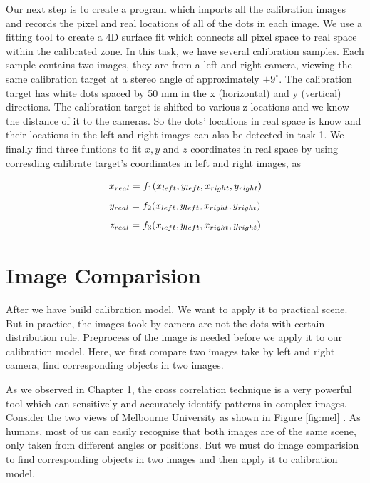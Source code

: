 Our next step is to create a program which imports all the calibration images and records the pixel and real locations of all of the dots in each image. We use a fitting tool to create a 4D surface fit which connects all pixel space to real space within the calibrated zone. In this task, we have several calibration samples. Each sample contains two images, they are from a left and right camera, viewing the same calibration target at a stereo angle of approximately $\pm9^{\circ}$. The calibration target has white dots spaced by 50 mm in the x (horizontal) and y (vertical) directions. The calibration target is shifted to various z locations and we know the distance of it to the cameras. So the dots' locations in real space is know and their locations in the left and right images can also be detected in task 1. We finally find three funtions to fit $x,y$ and $z$ coordinates in real space by using corresding calibrate target's coordinates in left and right images, as

\begin{equation*}
	\centering
	x_{real} = f_{1}(x_{left}, y_{left}, x_{right}, y_{right}) 
\end{equation*}
\begin{equation*}
	\centering
	y_{real} = f_{2}(x_{left}, y_{left}, x_{right}, y_{right}) 
\end{equation*}
\begin{equation*}
	\centering
	z_{real} = f_{3}(x_{left}, y_{left}, x_{right}, y_{right}) 
\end{equation*}


\section{Image Comparision}

After we have build calibration model. We want to apply it to practical scene. But in practice, the images took by camera are not the dots with certain distribution rule. Preprocess of the image is needed before we apply it to our calibration model. Here, we first compare two images take by left and right camera, find corresponding objects in two images.

As we observed in Chapter 1, the cross correlation technique is a very powerful tool which can sensitively and accurately identify patterns in complex images. Consider the two views of Melbourne University as shown in Figure \ref{fig:mel} . As humans, most of us can easily recognise that both images are of the same scene, only taken from different angles or positions. But we must do image comparision to find corresponding objects in two images and then apply it to calibration model.

